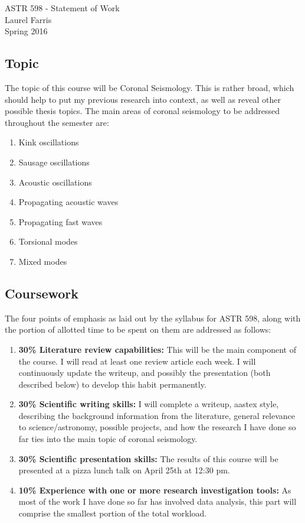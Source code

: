 \documentclass[12pt]{article}
\begin{document}
\begin{center}\Large
    \Large ASTR 598 - Statement of Work\\
    \large Laurel Farris\\
    \normalsize Spring 2016
\end{center}

\subsection*{Topic}
The topic of this course will be Coronal Seismology. This is rather
broad, which should help
to put my previous research into context, as well as reveal other
possible thesis topics. The
main areas of coronal seismology to be addressed throughout the
semester are:
\begin{enumerate}
    \item Kink oscillations
    \item Sausage oscillations
    \item Acoustic oscillations
    \item Propagating acoustic waves
    \item Propagating fast waves
    \item Torsional modes
    \item Mixed modes
\end{enumerate}

\subsection*{Coursework}
The four points of emphasis as laid out by the syllabus for ASTR 598,
along with the portion
of allotted time to be spent on them are addressed as follows:
\begin{enumerate}
    \item \textbf{30\% Literature review capabilities:}
        This will be the main component of the course.
        I will read at least one review article each week. I will
        continuously update the writeup,
        and possibly the presentation (both described below) to
        develop this habit permanently.
    \item \textbf{30\% Scientific writing skills:}
        I will complete a writeup, aastex style, describing the background
        information from the literature, general relevance to
        science/astronomy, possible projects,
        and how the research I have done so far ties into the main topic
        of coronal seismology.
    \item \textbf{30\% Scientific presentation skills:}
        The results of this course will be presented at a pizza lunch
        talk on April 25th at 12:30 pm.
    \item \textbf{10\% Experience with one or more research
        investigation tools:}
        As most of the work I have done so far has involved data
        analysis, this part will comprise the smallest portion of the
        total workload.
\end{enumerate}
\end{document}
